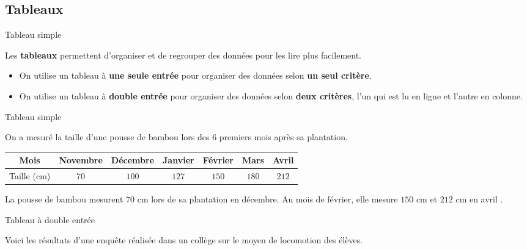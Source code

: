 \begin{pageCours} 

\section{Tableaux}

\begin{DefT}{Tableau simple}

Les \textbf{tableaux} permettent d'organiser et de regrouper des données pour les lire plus facilement.
\begin{itemize}
\item On utilise un tableau à \textbf{une seule entrée} pour organiser des données selon \textbf{un seul critère}.
\item On utilise un tableau à \textbf{double entrée} pour organiser des données selon \textbf{deux critères}, l'un qui est lu en ligne et l'autre en colonne.
\end{itemize}

\end{DefT}


\begin{ExT}{Tableau simple}

On a mesuré la taille d'une pousse de bambou lors des 6 premiers mois après sa plantation.
 \begin{center}
 \begin{tabular}{|c|c|c|c|c|c|c|} 
  \hline
  Mois & Novembre & Décembre & Janvier  & Février & Mars & Avril \\
  \hline
  Taille (cm) & \textcolor{sacado_green}{$70$} & $100$ & $127$ & \textcolor{sacado_violet}{$150$} & $180$ & \textcolor{sacado_orange}{$212$}  \\
  \hline
 \end{tabular}
 \end{center}

La pousse de bambou mesurent \textcolor{sacado_green}{$70$} cm lors de sa plantation en décembre. Au mois de février, elle mesure \textcolor{sacado_violet}{$150$} cm et \textcolor{sacado_orange}{$212$} cm en avril .
\end{ExT}


\begin{ExT}{Tableau à double entrée}

	Voici les résultats d'une enquête réalisée dans un collège sur le moyen de locomotion des élèves.


\end{ExT}
\end{pageCours}
